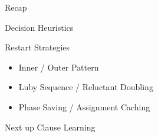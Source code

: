 \documentclass[t]{sdqbeamer2}
\begin{document}
\begin{frame}{Recap}
	\begin{block}{Decision Heuristics}
	\end{block}
	\begin{block}{Restart Strategies}
		\begin{itemize}\setlength{\itemsep}{1ex}
			\item Inner / Outer Pattern
			\item Luby Sequence / Reluctant Doubling
			\item Phase Saving / Assignment Caching
		\end{itemize}
	\end{block}
	\begin{block}{Next up}
		Clause Learning
	\end{block}
\end{frame}
\end{document}
